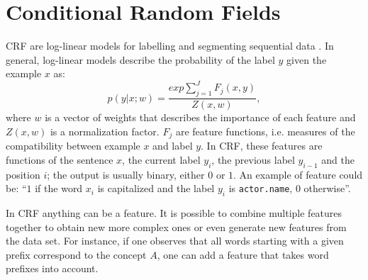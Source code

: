 \section{Conditional Random Fields}
\label{sec:crf}

\ac{CRF} are log-linear models for labelling and segmenting sequential data \cite{elkan}.
In general, log-linear models describe the probability of the label $y$ given the example $x$ as:
\begin{equation*}
    p(y|x;w) = \frac{exp \sum_{j = 1}^{J} F_{j}(x, y)}{Z(x, w)},
\end{equation*}
where $w$ is a vector of weights that describes the importance of each feature and $Z(x,w)$ is a normalization factor.
$F_{j}$ are feature functions, i.e. measures of the compatibility between example $x$ and label $y$.
In \ac{CRF}, these features are functions of the sentence $x$, the current label $y_{i}$, the previous label $y_{i-1}$ and the position $i$;
the output is usually binary, either $0$ or $1$.
An example of feature could be: ``$1$ if the word $x_i$ is capitalized and the label $y_i$ is \texttt{actor.name}, $0$ otherwise''.

In \ac{CRF} anything can be a feature.
It is possible to combine multiple features together to obtain new more complex ones or even generate new features from the data set.
For instance, if one observes that all words starting with a given prefix correspond to the concept $A$, one can add a feature that takes word prefixes into account.
